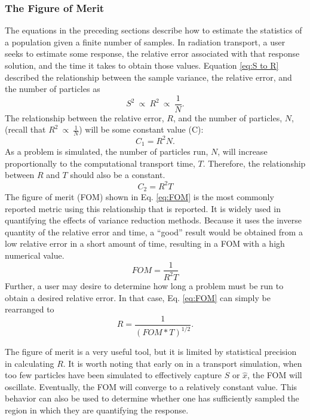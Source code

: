\subsubsection{The Figure of Merit}
\label{subsubsec:FOM}

The equations in the preceding sections describe how to estimate the statistics
of a population given a finite number of samples. In radiation transport, a
user seeks to estimate some response, the relative error associated with that
response solution, and the time it takes to obtain those values. Equation
\eqref{eq:S to R} described the relationship between the sample variance, the
relative error, and the number of particles as
\begin{equation*}
S^2\:\propto\: R^2\:\propto\:\frac{1}{N} .
\end{equation*}
The relationship between the relative error, $R$, and the number of particles,
$N$, (recall that $R^2\:\propto\:\frac{1}{N}$)
will be some constant value (C):
\begin{equation*}
 C_1 = R^2N .
\end{equation*}
As a problem is simulated, the number of particles run, $N$, will increase
proportionally to the computational transport time, $T$. Therefore, the
relationship between $R$ and $T$ should also be a constant.
\begin{equation*}
  C_2 = R^2T
\end{equation*}
The figure of merit (FOM) shown in Eq. \eqref{eq:FOM}
is the most commonly reported metric using this relationship that is reported.
It is widely used in quantifying the effects of variance reduction methods.
Because it uses the inverse quantity of the relative error and time, a
``good'' result would be obtained from a low relative error in a short amount of
time, resulting in a FOM with a high numerical value.
\begin{equation}
FOM=\frac { 1 }{ R^{ 2 }T }
\label{eq:FOM}
\end{equation}
Further, a user may desire to determine how long a problem must be run to obtain
a desired relative error. In that case, Eq. \eqref{eq:FOM} can simply be
rearranged to
\begin{equation*}
  R = \frac{1}{(FOM*T)^{1/2}} .
\end{equation*}

The figure of merit is a very useful tool, but it is limited by statistical
precision in calculating $R$.
It is worth noting that early on in a transport simulation,
when too few particles have been simulated to
effectively capture $S$ or $\hat{x}$, the FOM will oscillate.
Eventually, the FOM will converge to a relatively constant value. This behavior can
also be used to determine whether one has sufficiently sampled the
region in which they are quantifying the response.

